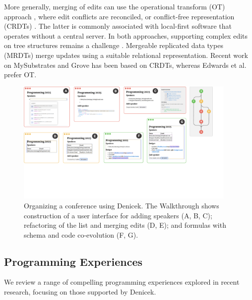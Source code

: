 \documentclass[sigconf,anonymous,screen]{acmart}
\begin{document}
More generally, merging of edits can use the operational transform (OT) approach
\cite{davis-2002-otsgml}, where edit conflicts are reconciled, or conflict-free
representation (CRDTs) \cite{shapiro-2011-crdts,litt-2022-peritext}. The latter is commonly associated
with local-first software \cite{kleppmann-2019-local} that operates without a central server.
In both approaches, supporting complex edits on tree structures
remains a challenge \cite{jungnickel-2016-otjson,da-2024-jsoncrdt}. Mergeable replicated data
types (MRDTs) \cite{kaki-2019-mrdts} merge updates using a suitable relational
representation. Recent work on MySubstrates and Grove \cite{adams-2025-grove,klokmose-2024-mywebstrates}
has been based on CRDTs, whereas Edwards et al. \cite{edwards-2021-typed} prefer OT.


\begin{figure}[t]
\includegraphics[width=0.95\textwidth,clip,trim=0cm 6cm 1.7cm 0cm]{fig/walkthrough.pdf}
\caption{Organizing a conference using Denicek. The Walkthrough shows construction of a user
  interface for adding speakers (A, B, C); refactoring of the list and merging edits (D, E); and
  formulas with schema and code co-evolution (F, G).}
\label{fig:walkthrough}
\end{figure}


\subsection{Programming Experiences}
\label{sec:background-exp}

We review a range of compelling programming experiences explored in recent research,
focusing on those supported by Denicek.
\end{document}
